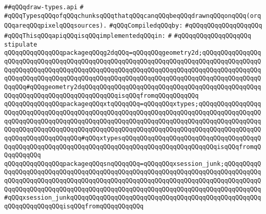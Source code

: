\label{src/lib/x-kit/xclient/src/window/draw-types.api}
\verb|##qQQqdraw-types.api|\newline
\verb|#|\newline
\verb|#qQQqTypesqQQqofqQQqchunksqQQqthatqQQqcanqQQqbeqQQqdrawnqQQqonqQQq(orqQQqareqQQqpixelqQQqsources).|\newline
\newline
\verb|#qQQqCompiledqQQqby:|\newline
\verb|#qQQqqQQqqQQqqQQqqQQq|\newline
\newline
\verb|#qQQqThisqQQqapiqQQqisqQQqimplementedqQQqin:|\newline
\verb|#|\newline
\verb|#qQQqqQQqqQQqqQQqqQQq|\newline
\newline
\verb|stipulate|\newline
\verb|qQQqqQQqqQQqqQQqpackageqQQqg2dqQQq=qQQqqQQqgeometry2d;qQQqqQQqqQQqqQQqqQQqqQQqqQQqqQQqqQQqqQQqqQQqqQQqqQQqqQQqqQQqqQQqqQQqqQQqqQQqqQQqqQQqqQQqqQQqqQQqqQQqqQQqqQQqqQQqqQQqqQQqqQQqqQQqqQQqqQQqqQQqqQQqqQQqqQQqqQQqqQQqqQQqqQQqqQQqqQQqqQQqqQQqqQQqqQQqqQQqqQQqqQQqqQQqqQQqqQQqqQQqqQQqqQQqqQQq#qQQqgeometry2dqQQqqQQqqQQqqQQqqQQqqQQqqQQqqQQqqQQqqQQqqQQqqQQqqQQqqQQqqQQqqQQqqQQqqQQqqQQqqQQqisqQQqfromqQQqqQQqqQQq|\newline
\verb|qQQqqQQqqQQqqQQqpackageqQQqxtqQQqqQQq=qQQqqQQqxtypes;qQQqqQQqqQQqqQQqqQQqqQQqqQQqqQQqqQQqqQQqqQQqqQQqqQQqqQQqqQQqqQQqqQQqqQQqqQQqqQQqqQQqqQQqqQQqqQQqqQQqqQQqqQQqqQQqqQQqqQQqqQQqqQQqqQQqqQQqqQQqqQQqqQQqqQQqqQQqqQQqqQQqqQQqqQQqqQQqqQQqqQQqqQQqqQQqqQQqqQQqqQQqqQQqqQQqqQQqqQQqqQQqqQQqqQQqqQQqqQQqqQQqqQQq#qQQqxtypesqQQqqQQqqQQqqQQqqQQqqQQqqQQqqQQqqQQqqQQqqQQqqQQqqQQqqQQqqQQqqQQqqQQqqQQqqQQqqQQqqQQqqQQqqQQqqQQqisqQQqfromqQQqqQQqqQQq|\newline
\verb|qQQqqQQqqQQqqQQqpackageqQQqsnqQQqqQQq=qQQqqQQqxsession_junk;qQQqqQQqqQQqqQQqqQQqqQQqqQQqqQQqqQQqqQQqqQQqqQQqqQQqqQQqqQQqqQQqqQQqqQQqqQQqqQQqqQQqqQQqqQQqqQQqqQQqqQQqqQQqqQQqqQQqqQQqqQQqqQQqqQQqqQQqqQQqqQQqqQQqqQQqqQQqqQQqqQQqqQQqqQQqqQQqqQQqqQQqqQQqqQQqqQQqqQQqqQQqqQQqqQQqqQQqqQQq#qQQqxsession_junkqQQqqQQqqQQqqQQqqQQqqQQqqQQqqQQqqQQqqQQqqQQqqQQqqQQqqQQqqQQqqQQqqQQqisqQQqfromqQQqqQQqqQQq|\newline
